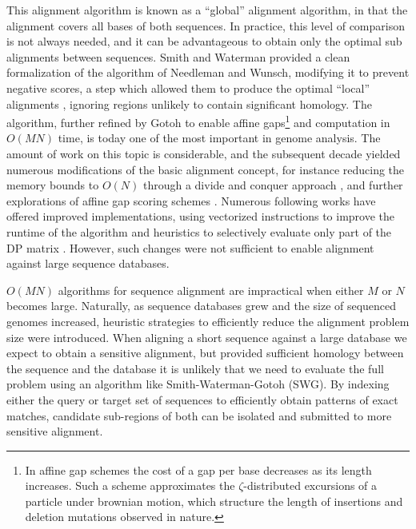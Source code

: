 This alignment algorithm is known as a ``global'' alignment algorithm, in that the alignment covers all bases of both sequences.
In practice, this level of comparison is not always needed, and it can be advantageous to obtain only the optimal sub alignments between sequences.
Smith and Waterman provided a clean formalization of the algorithm of Needleman and Wunsch, modifying it to prevent negative scores, a step which allowed them to produce the optimal ``local'' alignments \cite{smith1981comparison}, ignoring regions unlikely to contain significant homology.
The algorithm, further refined by Gotoh \cite{gotoh1982improved} to enable affine gaps\footnote{In affine gap schemes the cost of a gap per base decreases as its length increases. Such a scheme approximates the $\zeta$-distributed excursions of a particle under brownian motion, which structure the length of insertions and deletion mutations observed in nature.} and computation in $O(MN)$ time, is today one of the most important in genome analysis.
The amount of work on this topic is considerable, and the subsequent decade yielded numerous modifications of the basic alignment concept, for instance reducing the memory bounds to $O(N)$ through a divide and conquer approach \cite{myers1988optimal}, and further explorations of affine gap scoring schemes \cite{altschul1986optimal,gotoh1990optimal}.
Numerous following works have offered improved implementations, using vectorized instructions to improve the runtime of the algorithm \cite{farrar2007striped} and heuristics to selectively evaluate only part of the DP matrix \cite{suzuki2017acceleration}.
However, such changes were not sufficient to enable alignment against large sequence databases.

$O(MN)$ algorithms for sequence alignment are impractical when either $M$ or $N$ becomes large.
Naturally, as sequence databases grew and the size of sequenced genomes increased, heuristic strategies to efficiently reduce the alignment problem size were introduced.
When aligning a short sequence against a large database we expect to obtain a sensitive alignment, but provided sufficient homology between the sequence and the database it is unlikely that we need to evaluate the full problem using an algorithm like Smith-Waterman-Gotoh (SWG).
By indexing either the query or target set of sequences to efficiently obtain patterns of exact matches, candidate sub-regions of both can be isolated and submitted to more sensitive alignment.

